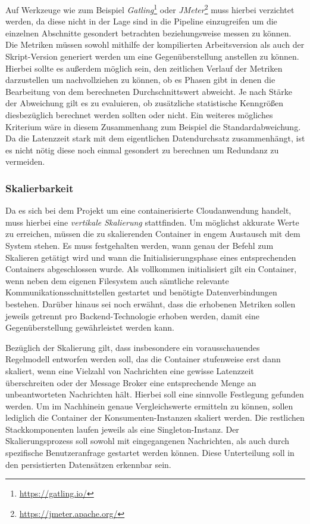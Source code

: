 Auf Werkzeuge wie zum Beispiel \emph{Gatling}\footnote{\url{https://gatling.io/}} oder \emph{JMeter}\footnote{\url{https://jmeter.apache.org/}} muss hierbei verzichtet werden, da diese nicht in der Lage sind in die Pipeline einzugreifen um die einzelnen Abschnitte gesondert betrachten beziehungsweise messen zu können. Die Metriken müssen sowohl mithilfe der kompilierten Arbeitsversion als auch der Skript-Version generiert werden um eine Gegenüberstellung anstellen zu können. Hierbei sollte es außerdem möglich sein, den zeitlichen Verlauf der Metriken darzustellen um nachvollziehen zu können, ob es Phasen gibt in denen die Bearbeitung von dem berechneten Durchschnittswert abweicht. Je nach Stärke der Abweichung gilt es zu evaluieren, ob zusätzliche statistische Kenngrößen diesbezüglich berechnet werden sollten oder nicht. Ein weiteres mögliches Kriterium wäre in diesem Zusammenhang zum Beispiel die Standardabweichung. Da die Latenzzeit stark mit dem eigentlichen Datendurchsatz zusammenhängt, ist es nicht nötig diese noch einmal gesondert zu berechnen um Redundanz zu vermeiden.


\subsubsection{Skalierbarkeit \checkmark}
Da es sich bei dem Projekt um eine containerisierte Cloudanwendung handelt, muss hierbei eine \emph{vertikale Skalierung} stattfinden. Um möglichst akkurate Werte zu erreichen, müssen die zu skalierenden Container in engem Austausch mit dem System stehen. Es muss festgehalten werden, wann genau der Befehl zum Skalieren getätigt wird und wann die Initialisierungsphase eines entsprechenden Containers abgeschlossen wurde. Als vollkommen initialisiert gilt ein Container, wenn neben dem eigenen Filesystem auch sämtliche relevante Kommunikationsschnittstellen gestartet und benötigte Datenverbindungen bestehen. Darüber hinaus sei noch erwähnt, dass die erhobenen Metriken sollen jeweils getrennt pro Backend-Technologie erhoben werden, damit eine Gegenüberstellung gewährleistet werden kann.

Bezüglich der Skalierung gilt, dass insbesondere ein vorausschauendes Regelmodell entworfen werden soll, das die Container stufenweise erst dann skaliert, wenn eine Vielzahl von Nachrichten eine gewisse Latenzzeit überschreiten oder der Message Broker eine entsprechende Menge an unbeantworteten Nachrichten hält. Hierbei soll eine sinnvolle Festlegung gefunden werden. Um im Nachhinein genaue Vergleichswerte ermitteln zu können, sollen lediglich die Container der Konsumenten-Instanzen skaliert werden. Die restlichen Stackkomponenten laufen jeweils als eine Singleton-Instanz. Der Skalierungsprozess soll sowohl mit eingegangenen Nachrichten, als auch durch spezifische Benutzeranfrage gestartet werden können. Diese Unterteilung soll in den persistierten Datensätzen erkennbar sein.


